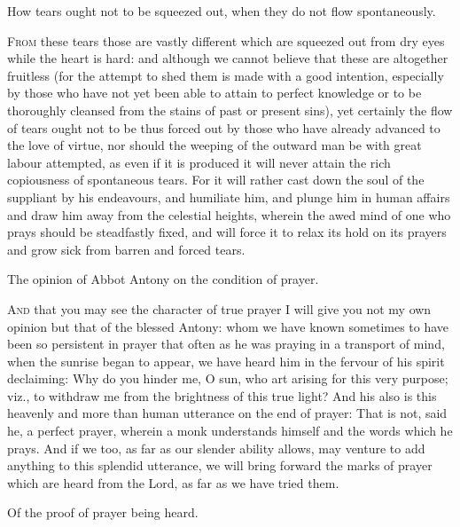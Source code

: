 
How tears ought not to be squeezed out, when they do not flow spontaneously.

\textsc{From} these tears those are vastly different which are squeezed out from dry eyes while the heart is hard: and although we cannot believe that these are altogether fruitless (for the attempt to shed them is made with a good intention, especially by those who have not yet been able to attain to perfect knowledge or to be thoroughly cleansed from the stains of past or present sins), yet certainly the flow of tears ought not to be thus forced out by those who have already advanced to the love of virtue, nor should the weeping of the outward man be with great labour attempted, as even if it is produced it will never attain the rich copiousness of spontaneous tears. For it will rather cast down the soul of the suppliant by his endeavours, and humiliate him, and plunge him in human affairs and draw him away from the celestial heights, wherein the awed mind of one who prays should be steadfastly fixed, and will force it to relax its hold on its prayers and grow sick from barren and forced tears.


The opinion of Abbot Antony on the condition of prayer.

\textsc{And} that you may see the character of true prayer I will give you not my own opinion but that of the blessed Antony: whom we have known sometimes to have been so persistent in prayer that often as he was praying in a transport of mind, when the sunrise began to appear, we have heard him in the fervour of his spirit declaiming: Why do you hinder me, O sun, who art arising for this very purpose; viz., to withdraw me from the brightness of this true light? And his also is this heavenly and more than human utterance on the end of prayer: That is not, said he, a perfect prayer, wherein a monk understands himself and the words which he prays. And if we too, as far as our slender ability allows, may venture to add anything to this splendid utterance, we will bring forward the marks of prayer which are heard from the Lord, as far as we have tried them.


Of the proof of prayer being heard.

